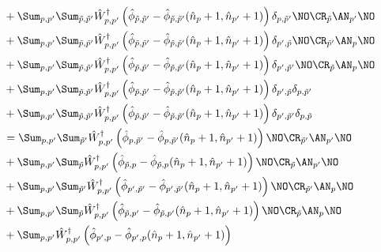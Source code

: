 \begin{appendix}
\begin{itemize}
\begin{align}
&+\Sum_{p, p^\prime}\Sum_{\tilde p,\tilde p^\prime}\hat W_{p,p^\prime}^\dagger \left(\hat\phi_{\tilde p,\tilde p^\prime}-\hat\phi_{\tilde p,\tilde p^\prime}(\hat n_p+1,\hat n_{p^\prime}+1)\right)\delta_{p,\tilde p^\prime}\NO\CR_{\tilde p}\AN_{p^\prime}\NO \nonumber\\
&+\Sum_{p, p^\prime}\Sum_{\tilde p,\tilde p^\prime}\hat W_{p,p^\prime}^\dagger \left(\hat\phi_{\tilde p,\tilde p^\prime}-\hat\phi_{\tilde p,\tilde p^\prime}(\hat n_p+1,\hat n_{p^\prime}+1)\right)\delta_{p^\prime,\tilde p}\NO\CR_{\tilde p^\prime}\AN_{p}\NO \nonumber\\
&+\Sum_{p, p^\prime}\Sum_{\tilde p,\tilde p^\prime}\hat W_{p,p^\prime}^\dagger \left(\hat\phi_{\tilde p,\tilde p^\prime}-\hat\phi_{\tilde p,\tilde p^\prime}(\hat n_p+1,\hat n_{p^\prime}+1)\right)\delta_{p^\prime,\tilde p^\prime}\NO\CR_{\tilde p}\AN_{p}\NO \nonumber\\
&+\Sum_{p, p^\prime}\Sum_{\tilde p,\tilde p^\prime}\hat W_{p,p^\prime}^\dagger \left(\hat\phi_{\tilde p,\tilde p^\prime}-\hat\phi_{\tilde p,\tilde p^\prime}(\hat n_p+1,\hat n_{p^\prime}+1)\right)\delta_{p^\prime,\tilde p}\delta_{p,\tilde p^\prime} \nonumber\\
&+\Sum_{p, p^\prime}\Sum_{\tilde p,\tilde p^\prime}\hat W_{p,p^\prime}^\dagger \left(\hat\phi_{\tilde p,\tilde p^\prime}-\hat\phi_{\tilde p,\tilde p^\prime}(\hat n_p+1,\hat n_{p^\prime}+1)\right)\delta_{p^\prime,\tilde p^\prime}\delta_{p,\tilde p} \nonumber\\
&= \Sum_{p, p^\prime}\Sum_{\tilde p^\prime}\hat W_{p,p^\prime}^\dagger \left(\hat\phi_{ p,\tilde p^\prime}-\hat\phi_{ p,\tilde p^\prime}(\hat n_p+1,\hat n_{p^\prime}+1)\right)\NO\CR_{\tilde p^\prime}\AN_{p^\prime}\NO \\
&+\Sum_{p, p^\prime}\Sum_{\tilde p}\hat W_{p,p^\prime}^\dagger \left(\hat\phi_{\tilde p,p}-\hat\phi_{\tilde p,p}(\hat n_p+1,\hat n_{p^\prime}+1)\right)\NO\CR_{\tilde p}\AN_{p^\prime}\NO \nonumber\\
&+\Sum_{p, p^\prime}\Sum_{\tilde p^\prime}\hat W_{p,p^\prime}^\dagger \left(\hat\phi_{p^\prime,\tilde p^\prime}-\hat\phi_{p^\prime,\tilde p^\prime}(\hat n_p+1,\hat n_{p^\prime}+1)\right)\NO\CR_{\tilde p^\prime}\AN_{p}\NO \nonumber\\
&+\Sum_{p, p^\prime}\Sum_{\tilde p}\hat W_{p,p^\prime}^\dagger \left(\hat\phi_{\tilde p, p^\prime}-\hat\phi_{\tilde p, p^\prime}(\hat n_p+1,\hat n_{p^\prime}+1)\right)\NO\CR_{\tilde p}\AN_{p}\NO \nonumber\\
&+\Sum_{p, p^\prime}\hat W_{p,p^\prime}^\dagger \left(\hat\phi_{p^\prime,p}-\hat\phi_{p^\prime,p}(\hat n_p+1,\hat n_{p^\prime}+1)\right) \nonumber\\

\end{align}
\end{itemize}
\end{appendix}
